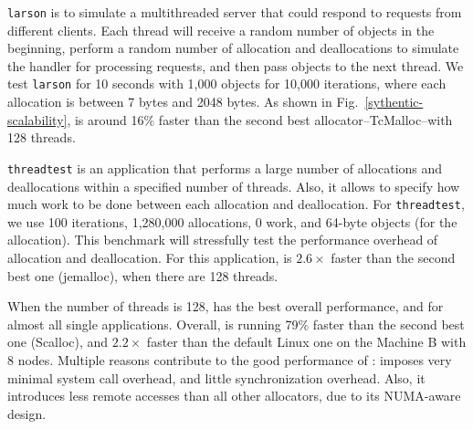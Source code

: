  \texttt{larson} is to simulate a multithreaded server that could respond to requests from different clients. Each thread  will receive a random number of objects in the beginning, perform a random number of allocation and deallocations to simulate the handler for processing requests, and then pass objects to the next thread. We test \texttt{larson} for 10 seconds with 1,000 objects for 10,000 iterations, where each allocation is between 7 bytes and 2048 bytes. As shown in Fig.~\ref{sythentic-scalability}, \NM{} is around 16\% faster than the second best allocator--TcMalloc--with 128 threads.   


\texttt{threadtest} is an application that performs a large number of allocations and deallocations within a specified number of threads. Also, it allows to specify how much work to be done between each allocation and deallocation. For \texttt{threadtest}, we use 100 iterations, 1,280,000 allocations, 0 work, and 64-byte objects (for the allocation).  This benchmark will stressfully test the performance overhead of allocation and deallocation. For this application, \NM{} is $2.6\times$ faster than the second best one (jemalloc), when there are 128 threads. %


When the number of threads is 128, \NM{} has the best overall performance, and for almost all single applications. Overall, \NM{} is running 79\% faster than the second best one (Scalloc), and $2.2\times$ faster than the default Linux one on the Machine B with 8 nodes. Multiple reasons contribute to the good performance of \NM{}: \NM{} imposes very minimal system call overhead, and little synchronization overhead. Also, it introduces less remote accesses than all other allocators, due to its NUMA-aware design. 




 

